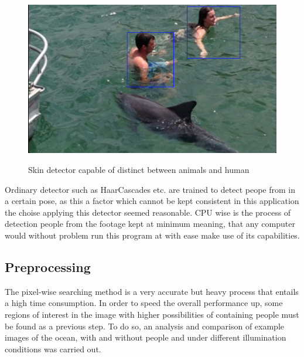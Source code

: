 \begin{figure}[H]
\centering
\includegraphics[width=\textwidth]{Images/humanDolphin}
\label{fig:humanAndDolphin}
\caption{Skin detector capable of distinct between animals and human}
\end{figure}

Ordinary detector such as HaarCascades etc. are trained to detect peope from in a certain pose, as this a factor which cannot be kept consistent in this application the choise applying this detector seemed reasonable. CPU wise is the process of detection people from the footage kept at minimum meaning, that any computer would without problem run this program at with ease make use of its capabilities. 


\subsection{Preprocessing}
The pixel-wise searching method is a very accurate but heavy process that entails a high time consumption.
In order to speed the overall performance up, some regions of interest in the image with higher possibilities of containing people must be found as a previous step. To do so, an analysis and comparison of example images of the ocean, with and without people and under different illumination conditions was carried out.  

